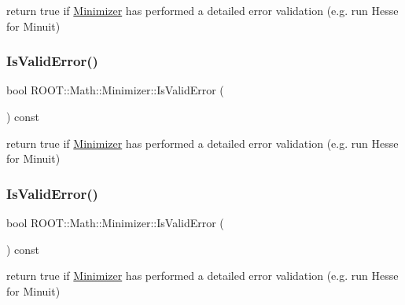 return true if \mbox{\hyperlink{classROOT_1_1Math_1_1Minimizer}{Minimizer}} has performed a detailed error validation (e.\+g. run Hesse for Minuit) 

\mbox{\label{classROOT_1_1Math_1_1Minimizer_aac4dfcda9c3eb7e672d450c0e78c61bf}} 
\subsubsection{\texorpdfstring{IsValidError()}{IsValidError()}\hspace{0.1cm}{\footnotesize\ttfamily [2/3]}}
{\footnotesize\ttfamily bool R\+O\+O\+T\+::\+Math\+::\+Minimizer\+::\+Is\+Valid\+Error (\begin{DoxyParamCaption}{ }\end{DoxyParamCaption}) const\hspace{0.3cm}{\ttfamily [inline]}}



return true if \mbox{\hyperlink{classROOT_1_1Math_1_1Minimizer}{Minimizer}} has performed a detailed error validation (e.\+g. run Hesse for Minuit) 

\mbox{\label{classROOT_1_1Math_1_1Minimizer_aac4dfcda9c3eb7e672d450c0e78c61bf}} 
\subsubsection{\texorpdfstring{IsValidError()}{IsValidError()}\hspace{0.1cm}{\footnotesize\ttfamily [3/3]}}
{\footnotesize\ttfamily bool R\+O\+O\+T\+::\+Math\+::\+Minimizer\+::\+Is\+Valid\+Error (\begin{DoxyParamCaption}{ }\end{DoxyParamCaption}) const\hspace{0.3cm}{\ttfamily [inline]}}



return true if \mbox{\hyperlink{classROOT_1_1Math_1_1Minimizer}{Minimizer}} has performed a detailed error validation (e.\+g. run Hesse for Minuit) 

\mbox{\label{classROOT_1_1Math_1_1Minimizer_a0d7f60c2e5b240258d32feed547b30a3}} 
